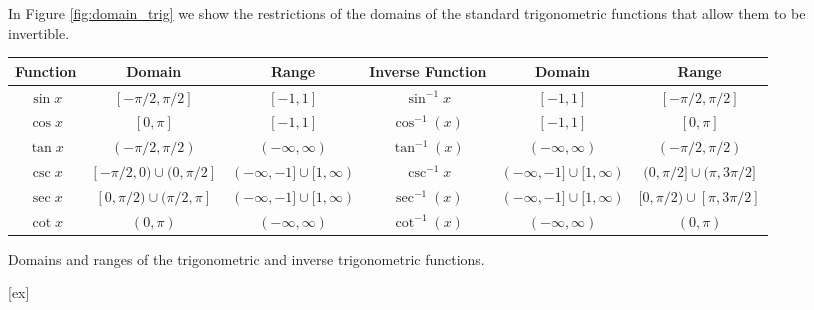 In Figure \ref{fig:domain_trig} we show the restrictions of the domains of the standard trigonometric functions that allow them to be invertible.\\

\small\noindent
\begin{tabular}{cccccc}
Function & Domain & Range &\parbox[b]{40pt}{\centering Inverse Function} & Domain & Range\\ \hline
\rule{0pt}{12pt} $\sin x$ & $[-\pi/2, \pi/2]$ & $[-1,1]$&$\sin^{-1} x$ & $[-1,1]$ & $[-\pi/2, \pi/2]$ \\
\rule{0pt}{12pt}$\cos x$ & $[0,\pi]$ & $[-1,1]$&$\cos^{-1}(x)$ & $[-1,1]$ & $[0,\pi]$ \\
\rule{0pt}{12pt}$\tan x$ & $(-\pi/2,\pi/2)$ & $(-\infty,\infty)$&$\tan^{-1}(x)$ & $(-\infty,\infty)$ & $(-\pi/2,\pi/2)$	\\
\rule{0pt}{12pt} $\csc x$ & $[-\pi/2,0)\cup (0, \pi/2]$ & $(-\infty,-1]\cup [1,\infty)$&$\csc^{-1} x$ & $(-\infty,-1]\cup [1,\infty)$ & $(0,\pi/2]\cup (\pi, 3\pi/2]$  \\
\rule{0pt}{12pt}$\sec x$ & $[0,\pi/2)\cup (\pi/2,\pi]$ & $(-\infty,-1]\cup [1,\infty)$&$\sec^{-1}(x)$ & $(-\infty,-1]\cup [1,\infty)$ & $[0,\pi/2)\cup [\pi,3\pi/2]$ \\
\rule{0pt}{12pt}$\cot x$ & $(0,\pi)$ & $(-\infty,\infty)$&$\cot^{-1}(x)$ &  $ (-\infty,\infty)$ & $(0,\pi)$	
\end{tabular}
\caption{Domains and ranges of the trigonometric and inverse trigonometric functions.}\label{fig:domain_trig}
[ex]
